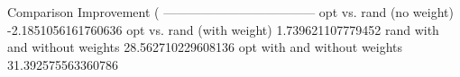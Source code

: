 Comparison	Improvement (%
------------------------------------
opt vs. rand (no weight)	-2.1851056161760636
opt vs. rand (with weight)	1.739621107779452
rand with and without weights	28.562710229608136
opt with and without weights	31.392575563360786
